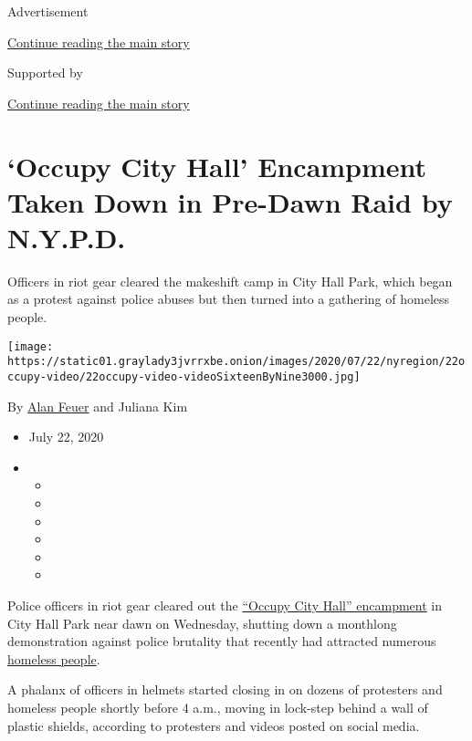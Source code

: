 Advertisement

\protect\hyperlink{after-top}{Continue reading the main story}

Supported by

\protect\hyperlink{after-sponsor}{Continue reading the main story}

\hypertarget{occupy-city-hall-encampment-taken-down-in-pre-dawn-raid-by-nypd}{%
\section{`Occupy City Hall' Encampment Taken Down in Pre-Dawn Raid by
N.Y.P.D.}\label{occupy-city-hall-encampment-taken-down-in-pre-dawn-raid-by-nypd}}

Officers in riot gear cleared the makeshift camp in City Hall Park,
which began as a protest against police abuses but then turned into a
gathering of homeless people.

\texttt{[image: https://static01.graylady3jvrrxbe.onion/images/2020/07/22/nyregion/22occupy-video/22occupy-video-videoSixteenByNine3000.jpg]}

By \href{https://www.nytimes3xbfgragh.onion/by/alan-feuer}{Alan Feuer}
and Juliana Kim

\begin{itemize}
\item
  July 22, 2020
\item
  \begin{itemize}
  \item
  \item
  \item
  \item
  \item
  \item
  \end{itemize}
\end{itemize}

Police officers in riot gear cleared out the
\href{https://www.nytimes3xbfgragh.onion/2020/06/28/nyregion/occupy-city-hall-nyc.html}{``Occupy
City Hall'' encampment} in City Hall Park near dawn on Wednesday,
shutting down a monthlong demonstration against police brutality that
recently had attracted numerous
\href{https://www.nytimes3xbfgragh.onion/2020/07/09/nyregion/occupy-city-hall-nyc-homeless.html}{homeless
people}.

A phalanx of officers in helmets started closing in on dozens of
protesters and homeless people shortly before 4 a.m., moving in
lock-step behind a wall of plastic shields, according to protesters and
videos posted on social media.

